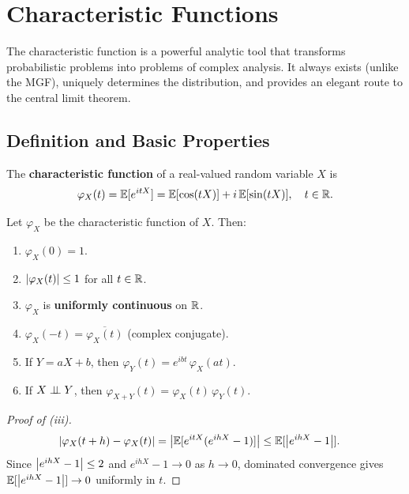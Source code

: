 \chapter{Characteristic Functions}
\label{ch:characteristic}

\begin{intuition}
The characteristic function is a powerful analytic tool that transforms
probabilistic problems into problems of complex analysis. It always exists
(unlike the MGF), uniquely determines the distribution, and provides an elegant
route to the central limit theorem.
\end{intuition}

\section{Definition and Basic Properties}

\begin{definition}
The \textbf{characteristic function} of a real-valued random variable $X$ is
\[
    \varphi_X(t) = \mathbb{E}[e^{itX}] = \mathbb{E}[\cos(tX)] + i\,\mathbb{E}[\sin(tX)], \quad t \in \mathbb{R}.
\]
\end{definition}

\begin{theorem}
\label{thm:cf_properties}
Let $\varphi_X$ be the characteristic function of $X$. Then:
\begin{enumerate}[label=(\roman*)]
    \item $\varphi_X(0) = 1$.
    \item $\left| \varphi_X(t) \right| \leq 1$ for all $t \in \mathbb{R}$.
    \item $\varphi_X$ is \textbf{uniformly continuous} on $\mathbb{R}$.
    \item $\varphi_X(-t) = \overline{\varphi_X(t)}$ (complex conjugate).
    \item If $Y = aX + b$, then $\varphi_Y(t) = e^{ibt}\,\varphi_X(at)$.
    \item If $X \perp\!\!\!\perp Y$, then $\varphi_{X+Y}(t) = \varphi_X(t)\,\varphi_Y(t)$.
\end{enumerate}
\end{theorem}

\begin{proof}[Proof of (iii)]
\begin{align*}
    \left| \varphi_X(t+h) - \varphi_X(t) \right|
    &= \left| \mathbb{E}[e^{itX}(e^{ihX}-1)] \right|
    \leq \mathbb{E}[\left| e^{ihX}-1 \right|].
\end{align*}
Since $\left| e^{ihX}-1 \right| \leq 2$ and $e^{ihX}-1 \to 0$ as $h \to 0$, dominated
convergence gives $\mathbb{E}[\left| e^{ihX}-1 \right|] \to 0$ uniformly in $t$.
\end{proof}

